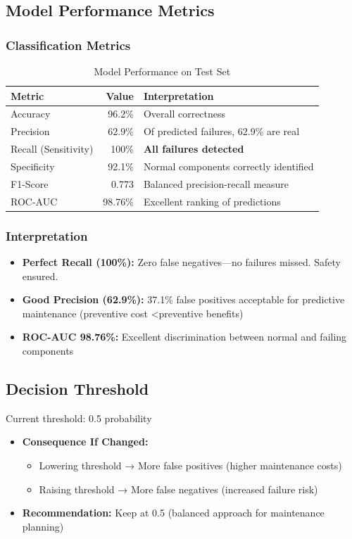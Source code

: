 \documentclass[11pt,a4paper]{article}
\begin{document}
\subsection{Model Performance Metrics}

\subsubsection{Classification Metrics}
\begin{table}[H]
\centering
\begin{tabular}{|l|r|p{5cm}|}
\toprule
\textbf{Metric} & \textbf{Value} & \textbf{Interpretation} \\
\midrule
Accuracy & 96.2\% & Overall correctness \\
Precision & 62.9\% & Of predicted failures, 62.9\% are real \\
Recall (Sensitivity) & 100\% & \textbf{All failures detected} \\
Specificity & 92.1\% & Normal components correctly identified \\
F1-Score & 0.773 & Balanced precision-recall measure \\
ROC-AUC & 98.76\% & Excellent ranking of predictions \\
\bottomrule
\end{tabular}
\caption{Model Performance on Test Set}
\end{table}

\subsubsection{Interpretation}
\begin{itemize}
    \item \textbf{Perfect Recall (100\%):} Zero false negatives---no failures missed. Safety ensured.
    \item \textbf{Good Precision (62.9\%):} 37.1\% false positives acceptable for predictive maintenance (preventive cost \textless preventive benefits)
    \item \textbf{ROC-AUC 98.76\%:} Excellent discrimination between normal and failing components
\end{itemize}

\subsection{Decision Threshold}
Current threshold: 0.5 probability
\begin{itemize}
    \item \textbf{Consequence If Changed:}
    \begin{itemize}
        \item Lowering threshold → More false positives (higher maintenance costs)
        \item Raising threshold → More false negatives (increased failure risk)
    \end{itemize}
    \item \textbf{Recommendation:} Keep at 0.5 (balanced approach for maintenance planning)
\end{itemize}
\end{document}
